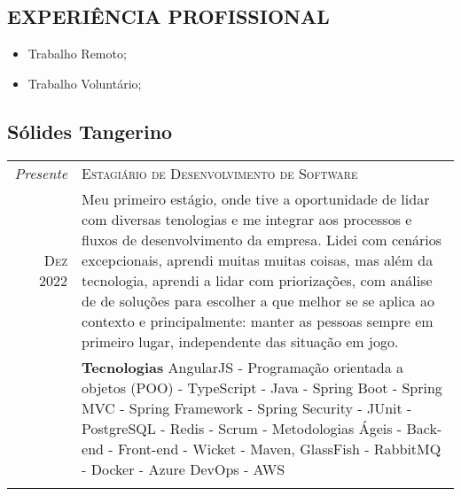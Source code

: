 
\begin{mdframed}
  \section{EXPERIÊNCIA PROFISSIONAL}
  \begin{itemize}
    \item Trabalho Remoto;
    \item Trabalho Voluntário;

  \end{itemize}

  \subsection{  Sólides Tangerino}

  \begin{tabular}{r|p{15cm}}
    \emph{Presente}   & \textsc{Estagiário de Desenvolvimento de Software}                                                                                                                                                                                                                                                                                                                                                                                                                          \\
    \textsc{Dez 2022} & \footnotesize{Meu primeiro estágio, onde tive a oportunidade de lidar com diversas tenologias e me integrar aos processos e fluxos de desenvolvimento da empresa. Lidei com cenários excepcionais, aprendi muitas muitas coisas, mas além da tecnologia, aprendi a lidar com priorizações, com análise de de soluções para escolher a que melhor se se aplica ao contexto e principalmente: manter as pessoas sempre em primeiro lugar, independente das situação em jogo.} \\
                      & \footnotesize{
      \textbf{Tecnologias}
    AngularJS - Programação orientada a objetos (POO) - TypeScript - Java - Spring Boot - Spring MVC - Spring Framework - Spring Security - JUnit - PostgreSQL - Redis -  Scrum - Metodologias Ágeis - Back-end - Front-end - Wicket - Maven, GlassFish - RabbitMQ - Docker - Azure DevOps - AWS }                                                                                                                                                                                                        \\
    \multicolumn{2}{c}{}
  \end{tabular}



\end{mdframed}
